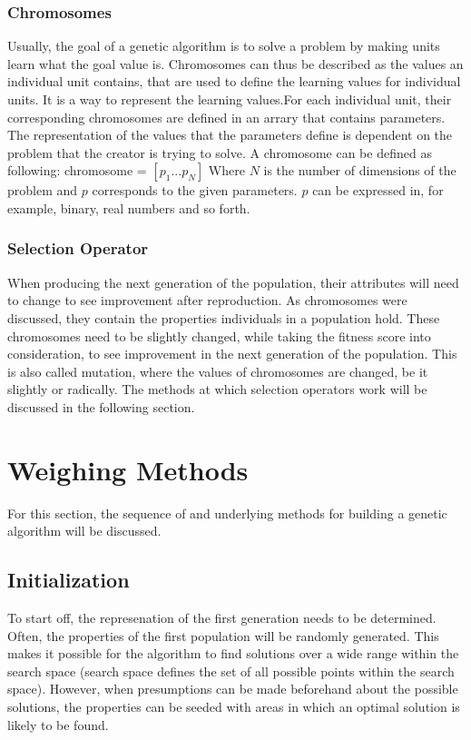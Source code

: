 \documentclass{article}
\begin{document}
\subsubsection{Chromosomes}
Usually, the goal of a genetic algorithm is to solve a problem by making units learn what the goal value is. Chromosomes can thus be described as the values an individual unit contains, that are used to define the learning values for individual units. It is a way to represent the learning values.\smallbreak For each individual unit, their corresponding chromosomes are defined in an arrary that contains parameters. The representation of the values that the parameters define is dependent on the problem that the creator is trying to solve. A chromosome can be defined as following:\bigbreak
chromosome = $\left[ p_{1} ... p_{N} \right]$\bigbreak
Where $N$ is the number of dimensions of the problem and $p$ corresponds to the given parameters. $p$ can be expressed in, for example, binary, real numbers and so forth.

\bigbreak
\subsubsection{Selection Operator}
When producing the next generation of the population, their attributes will need to change to see improvement after reproduction. As chromosomes were discussed, they contain the properties individuals in a population hold. These chromosomes need to be slightly changed, while taking the fitness score into consideration, to see improvement in the next generation of the population. This is also called mutation, where the values of chromosomes are changed, be it slightly or radically. The methods at which selection operators work will be discussed in the following section.
\newpage
\section{Weighing Methods}
For this section, the sequence of and underlying methods for building a genetic algorithm will be discussed. 
\bigskip

\subsection{Initialization}
To start off, the represenation of the first generation needs to be determined. Often, the properties of the first population will be randomly generated. This makes it possible for the algorithm to find solutions over a wide range within the search space (search space defines the set of all possible points within the search space). However, when presumptions can be made beforehand about the possible solutions, the properties can be seeded with areas in which an optimal solution is likely to be found.
\end{document}
